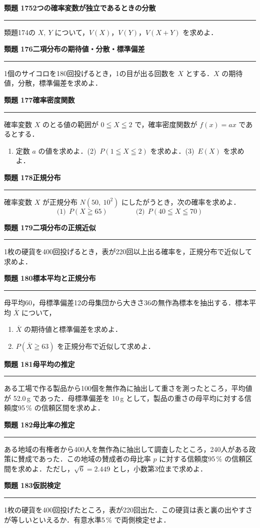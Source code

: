 \documentclass[a4paper,11pt]{ltjsarticle}
\newcommand{\mon}[2]{\Needspace{7\baselineskip}\vspace{10pt}%
  {\sffamily\bfseries 類題 #1\quad #2\par}\vspace{2pt}\hrule\vspace{4pt}}
\begin{document}
\mon{175}{2つの確率変数が独立であるときの分散}
類題174の $X,\ Y$ について，$V(X)$，$V(Y)$，$V(X+Y)$ を求めよ．

\mon{176}{二項分布の期待値・分散・標準偏差}
1個のサイコロを180回投げるとき，1の目が出る回数を $X$ とする．$X$ の期待値，分散，標準偏差を求めよ．

\mon{177}{確率密度関数}
確率変数 $X$ のとる値の範囲が $0\leqq X\leqq2$ で，確率密度関数が $f(x)=ax$ であるとする．
\begin{enumerate}
\item 定数 $a$ の値を求めよ．\qquad (2)\ $P(1\leqq X\leqq2)$ を求めよ．\qquad (3)\ $E(X)$ を求めよ．
\end{enumerate}

\mon{178}{正規分布}
確率変数 $X$ が正規分布 $N(50,\ 10^2)$ にしたがうとき，次の確率を求めよ．
\[\text{(1)}\ \ P(X\geqq65)\qquad\qquad\text{(2)}\ \ P(40\leqq X\leqq70)\]

\mon{179}{二項分布の正規近似}
1枚の硬貨を400回投げるとき，表が220回以上出る確率を，正規分布で近似して求めよ．

\mon{180}{標本平均と正規分布}
母平均60，母標準偏差12の母集団から大きさ36の無作為標本を抽出する．標本平均 $\overline X$ について，
\begin{enumerate}
\item $\overline X$ の期待値と標準偏差を求めよ．
\item $P(\overline X\geqq63)$ を正規分布で近似して求めよ．
\end{enumerate}

\mon{181}{母平均の推定}
ある工場で作る製品から100個を無作為に抽出して重さを測ったところ，平均値が 52.0\,g であった．母標準偏差を 10\,g として，製品の重さの母平均に対する信頼度95\,\% の信頼区間を求めよ．

\mon{182}{母比率の推定}
ある地域の有権者から400人を無作為に抽出して調査したところ，240人がある政策に賛成であった．この地域の賛成者の母比率 $p$ に対する信頼度95\,\% の信頼区間を求めよ．ただし，$\sqrt6=2.449$ とし，小数第3位まで求めよ．

\mon{183}{仮説検定}
1枚の硬貨を400回投げたところ，表が220回出た．この硬貨は表と裏の出やすさが等しいといえるか．有意水準5\,\% で両側検定せよ．
\end{document}
